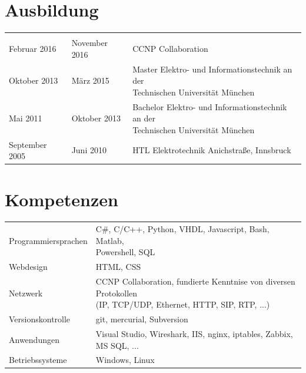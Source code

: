 	\section*{Ausbildung}
	\begin{tabularx}{\textwidth}{b{4cm}|b{3cm}|l}
		\thead{von} & \thead{bis} & \\
		Februar 2016 & November 2016 & CCNP Collaboration \\
		Oktober 2013 & März 2015 & \makecell[cl]{Master Elektro- und Informationstechnik an der \\ Technischen Universität München} \\
		Mai 2011 & Oktober 2013 & \makecell[cl]{Bachelor Elektro- und Informationstechnik an der \\ Technischen Universität München} \\
		September 2005 & Juni 2010 & HTL Elektrotechnik Anichstraße, Innsbruck
	\end{tabularx}

	\section*{Kompetenzen}
	\begin{tabularx}{\textwidth}{b{4cm}|l}
		Programmiersprachen & \makecell[cl]{C\#, C/C++, Python, VHDL, Javascript, Bash, Matlab, \\ Powershell, SQL} \\
		Webdesign & HTML, CSS \\
		Netzwerk & \makecell[cl]{CCNP Collaboration, fundierte Kenntnise von diversen Protokollen \\ (IP, TCP/UDP, Ethernet, HTTP, SIP, RTP, ...)} \\
		Versionskontrolle & git, mercurial, Subversion \\
		Anwendungen & Visual Studio, Wireshark, IIS, nginx, iptables, Zabbix, MS SQL, ... \\
		Betriebssysteme & Windows, Linux
	\end{tabularx}
